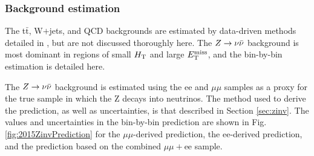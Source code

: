 \subsubsection{Background estimation}
The t$\bar{\text{t}}$, W$+$jets, and QCD backgrounds are estimated by data-driven methods detailed in \cite{CMS:2016nhb}, but are not discussed thoroughly here. The $Z\rightarrow \nu\bar{\nu}$ background is most dominant in regions of small $H_{\rm T}$ and large $E_{\text{T}}^{\rm miss}$, and the bin-by-bin estimation is detailed here.

The $Z\rightarrow \nu\bar{\nu}$ background is estimated using the ee and $\mu\mu$ samples as a proxy for the true sample in which the Z decays into neutrinos. The method used to derive the prediction, as well as uncertainties, is that described in Section \ref{sec:zinv}. The values and uncertainties in the bin-by-bin prediction are shown in Fig. \ref{fig:2015ZinvPrediction} for the $\mu\mu$-derived prediction, the ee-derived prediction, and the prediction based on the combined $\mu\mu+$ee sample. 
